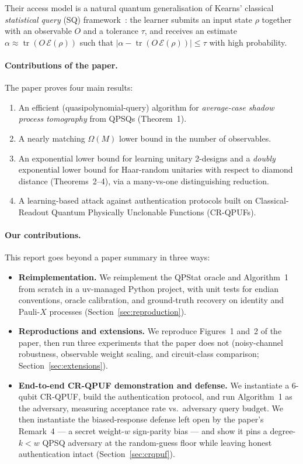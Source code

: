 \documentclass[11pt]{article}
\newcommand{\E}{\mathcal{E}}
\newcommand{\tr}{\operatorname{tr}}
\begin{document}
Their access model is a natural quantum generalisation of Kearns'
classical \emph{statistical query} (SQ) framework~\cite{kearns1993}: the
learner submits an input state $\rho$ together with an observable $O$
and a tolerance $\tau$, and receives an estimate
$\alpha \approx \tr(O\,\E(\rho))$ such that
$|\alpha - \tr(O\,\E(\rho))| \le \tau$ with high probability.

\paragraph{Contributions of the paper.}
The paper proves four main results:
\begin{enumerate}[leftmargin=*]
  \item An efficient (quasipolynomial-query) algorithm for
        \emph{average-case shadow process tomography} from QPSQs
        (Theorem~1).
  \item A nearly matching $\Omega(M)$ lower bound in the number of
        observables.
  \item An exponential lower bound for learning unitary 2-designs and a
        \emph{doubly} exponential lower bound for Haar-random unitaries
        with respect to diamond distance (Theorems~2--4), via a
        many-vs-one distinguishing reduction.
  \item A learning-based attack against authentication protocols built
        on Classical-Readout Quantum Physically Unclonable Functions
        (CR-QPUFs).
\end{enumerate}

\paragraph{Our contributions.}
This report goes beyond a paper summary in three ways:
\begin{itemize}[leftmargin=*]
  \item \textbf{Reimplementation.} We reimplement the QPStat oracle and
        Algorithm~1 from scratch in a uv-managed Python project, with
        unit tests for endian conventions, oracle calibration, and
        ground-truth recovery on identity and Pauli-$X$ processes
        (Section~\ref{sec:reproduction}).
  \item \textbf{Reproductions and extensions.} We reproduce Figures~1
        and~2 of the paper, then run three experiments that the paper
        does not (noisy-channel robustness, observable weight scaling,
        and circuit-class comparison; Section~\ref{sec:extensions}).
  \item \textbf{End-to-end CR-QPUF demonstration and defense.} We
        instantiate a 6-qubit CR-QPUF, build the authentication
        protocol, and run Algorithm~1 as the adversary, measuring
        acceptance rate vs.\ adversary query budget. We then
        instantiate the biased-response defense left open by the
        paper's Remark~4 --- a secret weight-$w$ sign-parity bias ---
        and show it pins a degree-$k < w$ QPSQ adversary at the
        random-guess floor while leaving honest authentication intact
        (Section~\ref{sec:crqpuf}).
\end{itemize}
\end{document}
